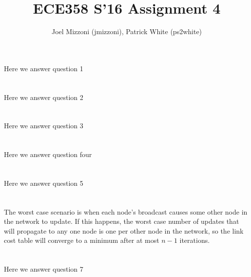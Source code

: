 \documentclass[10pt,a4paper]{article}
\author{Joel Mizzoni (jmizzoni), Patrick White (ps2white)}
\begin{document}
\title{ECE358 S'16 Assignment 4}
\maketitle
\section{}
Here we answer question 1
\section{}
Here we answer question 2
\section{}
Here we answer question 3
\section{}
Here we answer question four
\section{}
Here we answer question 5
\section{}
The worst case scenario is when each node's broadcast causes some other node in the network to update. If this happens, the worst case number of updates that will propagate to any one node is one per other node in the network, so the link cost table will converge to a minimum after at most $n - 1$ iterations.
\section{}
Here we answer question 7
\end{document}
